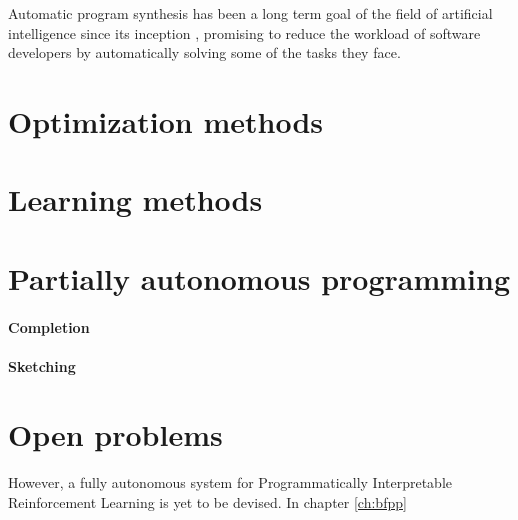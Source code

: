 Automatic program synthesis has been a long term goal of the field of artificial intelligence since its inception \cite{mannaAutomaticProgramSynthesis1971a}, promising to reduce the workload of software developers by automatically solving some of the tasks they face.

\section{Optimization methods}

\section{Learning methods}

\section{Partially autonomous programming}

\paragraph{Completion}

\paragraph{Sketching}

\section{Open problems}

However, a fully autonomous system for Programmatically Interpretable Reinforcement Learning is yet to be devised. In chapter \ref{ch:bfpp}